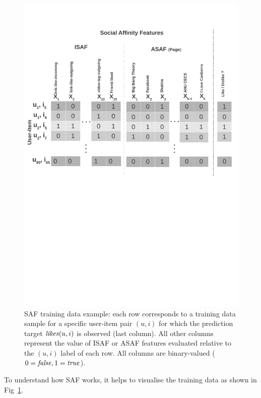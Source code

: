 \begin{figure}[t!]
\centering
\includegraphics[width=1\linewidth]{data/newPlots/saf_features}
\caption{SAF training data example: each row corresponds to a training
  data sample for a specific user-item pair $(u,i)$ for which the
  prediction target $\like(u,i)$ is observed (last column).  All other
  columns represent the value of ISAF or ASAF features
  evaluated relative to the $(u,i)$ label of each row.
  All columns are binary-valued ($0=\false,1=\true$).}
\label{fig:features_overview}
\end{figure}

To understand how SAF works, it helps to visualise the training data as shown
in Fig~\ref{fig:features_overview}.  

